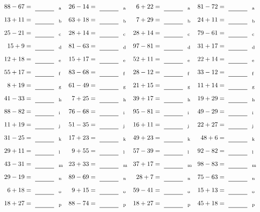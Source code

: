 \documentclass
[
  draft    = true,
  fontsize = 11pt,
  parskip  = half-
]
{scrartcl}
\begin{document}
\clearpage
\begin{align*}
    \pline{88-67}&=\rline{a}
  & \pline{26-14}&=\rline{a}
  & \pline{6+22}&=\rline{a}
  & \pline{81-72}&=\rline{a} \\[1ex]
    \pline{13+11}&=\rline{b}
  & \pline{63+18}&=\rline{b}
  & \pline{7+29}&=\rline{b}
  & \pline{24+11}&=\rline{b} \\[1ex]
    \pline{25-21}&=\rline{c}
  & \pline{28+14}&=\rline{c}
  & \pline{28+14}&=\rline{c}
  & \pline{79-61}&=\rline{c} \\[1ex]
    \pline{15+9}&=\rline{d}
  & \pline{81-63}&=\rline{d}
  & \pline{97-81}&=\rline{d}
  & \pline{31+17}&=\rline{d} \\[1ex]
    \pline{12+18}&=\rline{e}
  & \pline{15+17}&=\rline{e}
  & \pline{52+11}&=\rline{e}
  & \pline{22+14}&=\rline{e} \\[1ex]
    \pline{55+17}&=\rline{f}
  & \pline{83-68}&=\rline{f}
  & \pline{28-12}&=\rline{f}
  & \pline{33-12}&=\rline{f} \\[1ex]
    \pline{8+19}&=\rline{g}
  & \pline{61-49}&=\rline{g}
  & \pline{21+15}&=\rline{g}
  & \pline{11+14}&=\rline{g} \\[1ex]
    \pline{41-33}&=\rline{h}
  & \pline{7+25}&=\rline{h}
  & \pline{39+17}&=\rline{h}
  & \pline{19+29}&=\rline{h} \\[1ex]
    \pline{88-82}&=\rline{i}
  & \pline{76-68}&=\rline{i}
  & \pline{95-81}&=\rline{i}
  & \pline{49-29}&=\rline{i} \\[1ex]
    \pline{11+19}&=\rline{j}
  & \pline{51-35}&=\rline{j}
  & \pline{16+11}&=\rline{j}
  & \pline{22+27}&=\rline{j} \\[1ex]
    \pline{31-25}&=\rline{k}
  & \pline{17+23}&=\rline{k}
  & \pline{49+23}&=\rline{k}
  & \pline{48+6}&=\rline{k} \\[1ex]
    \pline{29+11}&=\rline{l}
  & \pline{9+55}&=\rline{l}
  & \pline{57-39}&=\rline{l}
  & \pline{92-82}&=\rline{l} \\[1ex]
    \pline{43-31}&=\rline{m}
  & \pline{23+33}&=\rline{m}
  & \pline{37+17}&=\rline{m}
  & \pline{98-83}&=\rline{m} \\[1ex]
    \pline{29-19}&=\rline{n}
  & \pline{89-69}&=\rline{n}
  & \pline{28+7}&=\rline{n}
  & \pline{75-63}&=\rline{n} \\[1ex]
    \pline{6+18}&=\rline{o}
  & \pline{9+15}&=\rline{o}
  & \pline{59-41}&=\rline{o}
  & \pline{15+13}&=\rline{o} \\[1ex]
    \pline{18+27}&=\rline{p}
  & \pline{88-74}&=\rline{p}
  & \pline{18+27}&=\rline{p}
  & \pline{45+18}&=\rline{p}
\end{align*}
\end{document}
